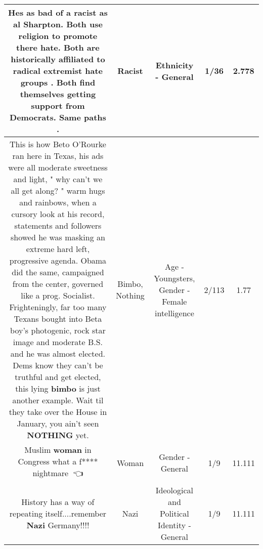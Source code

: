 \documentclass[11pt]{article}
\newlength\mylength
\begin{document}
\begin{center}
\begin{longtable}{|C{.65\mylength}|C{.30\mylength}|C{.12\mylength}|C{.12\mylength}|C{.12\mylength}|}
  \small Hes as bad of a \textbf{racist} as al Sharpton.  Both use religion to promote there hate. Both are historically affiliated to radical extremist hate groups . Both find themselves getting support from Democrats.  Same paths .\normalsize   & Racist & Ethnicity - General & 1/36 & 2.778 \\  \hline
  \small This is how Beto O'Rourke ran here in Texas, his ads were all moderate sweetness and light, " why can't we all get along? " warm hugs and rainbows, when a cursory look at his record, statements and followers showed he was masking an extreme hard left, progressive agenda.  Obama did the same, campaigned from the center, governed like a prog. Socialist. Frighteningly, far too many Texans bought into Beta boy's photogenic, rock star image and moderate B.S. and he was almost elected. Dems know they can't be truthful and get elected, this lying \textbf{bimbo} is just another example. Wait til they take over the House in January, you ain't seen \textbf{NOTHING} yet.\normalsize   & Bimbo, Nothing & Age - Youngsters, Gender - Female intelligence & 2/113 & 1.77 \\  \hline
  \small Muslim \textbf{woman} in Congress what a f**** nightmare 🤣👈\normalsize   & Woman & Gender - General & 1/9 & 11.111 \\  \hline
  \small History has a way of repeating itself....remember \textbf{Nazi} Germany!!!!\normalsize   & Nazi &  Ideological and Political Identity - General & 1/9 & 11.111 \\  \hline

\end{longtable}
\end{center}
\end{document}
